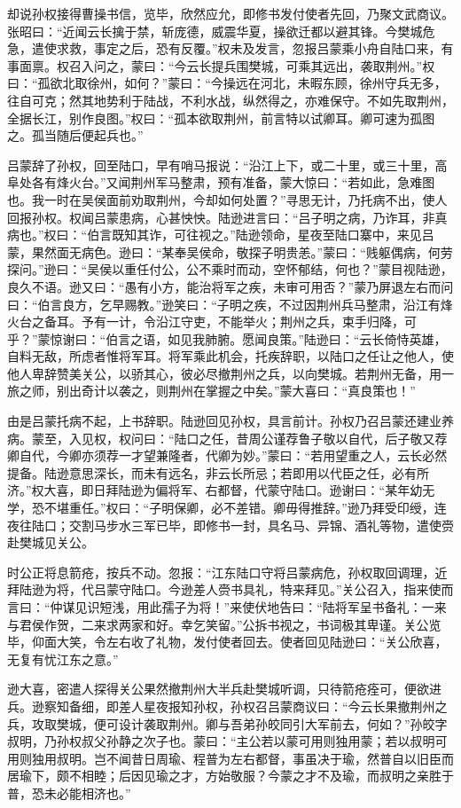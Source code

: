 却说孙权接得曹操书信，览毕，欣然应允，即修书发付使者先回，乃聚文武商议。张昭曰：“近闻云长擒于禁，斩庞德，威震华夏，操欲迁都以避其锋。今樊城危急，遣使求救，事定之后，恐有反覆。”权未及发言，忽报吕蒙乘小舟自陆口来，有事面禀。权召入问之，蒙曰：“今云长提兵围樊城，可乘其远出，袭取荆州。”权曰：“孤欲北取徐州，如何？”蒙曰：“今操远在河北，未暇东顾，徐州守兵无多，往自可克；然其地势利于陆战，不利水战，纵然得之，亦难保守。不如先取荆州，全据长江，别作良图。”权曰：“孤本欲取荆州，前言特以试卿耳。卿可速为孤图之。孤当随后便起兵也。”

吕蒙辞了孙权，回至陆口，早有哨马报说：“沿江上下，或二十里，或三十里，高阜处各有烽火台。”又闻荆州军马整肃，预有准备，蒙大惊曰：“若如此，急难图也。我一时在吴侯面前劝取荆州，今却如何处置？”寻思无计，乃托病不出，使人回报孙权。权闻吕蒙患病，心甚怏怏。陆逊进言曰：“吕子明之病，乃诈耳，非真病也。”权曰：“伯言既知其诈，可往视之。”陆逊领命，星夜至陆口寨中，来见吕蒙，果然面无病色。逊曰：“某奉吴侯命，敬探子明贵恙。”蒙曰：“贱躯偶病，何劳探问。”逊曰：“吴侯以重任付公，公不乘时而动，空怀郁结，何也？”蒙目视陆逊，良久不语。逊又曰：“愚有小方，能治将军之疾，未审可用否？”蒙乃屏退左右而问曰：“伯言良方，乞早赐教。”逊笑曰：“子明之疾，不过因荆州兵马整肃，沿江有烽火台之备耳。予有一计，令沿江守吏，不能举火；荆州之兵，束手归降，可乎？”蒙惊谢曰：“伯言之语，如见我肺腑。愿闻良策。”陆逊曰：“云长倚恃英雄，自料无敌，所虑者惟将军耳。将军乘此机会，托疾辞职，以陆口之任让之他人，使他人卑辞赞美关公，以骄其心，彼必尽撤荆州之兵，以向樊城。若荆州无备，用一旅之师，别出奇计以袭之，则荆州在掌握之中矣。”蒙大喜曰：“真良策也！”

由是吕蒙托病不起，上书辞职。陆逊回见孙权，具言前计。孙权乃召吕蒙还建业养病。蒙至，入见权，权问曰：“陆口之任，昔周公谨荐鲁子敬以自代，后子敬又荐卿自代，今卿亦须荐一才望兼隆者，代卿为妙。”蒙曰：“若用望重之人，云长必然提备。陆逊意思深长，而未有远名，非云长所忌；若即用以代臣之任，必有所济。”权大喜，即日拜陆逊为偏将军、右都督，代蒙守陆口。逊谢曰：“某年幼无学，恐不堪重任。”权曰：“子明保卿，必不差错。卿毋得推辞。”逊乃拜受印绶，连夜往陆口；交割马步水三军已毕，即修书一封，具名马、异锦、酒礼等物，遣使赍赴樊城见关公。

时公正将息箭疮，按兵不动。忽报：“江东陆口守将吕蒙病危，孙权取回调理，近拜陆逊为将，代吕蒙守陆口。今逊差人赍书具礼，特来拜见。”关公召入，指来使而言曰：“仲谋见识短浅，用此孺子为将！”来使伏地告曰：“陆将军呈书备礼：一来与君侯作贺，二来求两家和好。幸乞笑留。”公拆书视之，书词极其卑谨。关公览毕，仰面大笑，令左右收了礼物，发付使者回去。使者回见陆逊曰：“关公欣喜，无复有忧江东之意。”

逊大喜，密遣人探得关公果然撤荆州大半兵赴樊城听调，只待箭疮痊可，便欲进兵。逊察知备细，即差人星夜报知孙权，孙权召吕蒙商议曰：“今云长果撤荆州之兵，攻取樊城，便可设计袭取荆州。卿与吾弟孙皎同引大军前去，何如？”孙皎字叔明，乃孙权叔父孙静之次子也。蒙曰：“主公若以蒙可用则独用蒙；若以叔明可用则独用叔明。岂不闻昔日周瑜、程普为左右都督，事虽决于瑜，然普自以旧臣而居瑜下，颇不相睦；后因见瑜之才，方始敬服？今蒙之才不及瑜，而叔明之亲胜于普，恐未必能相济也。”

